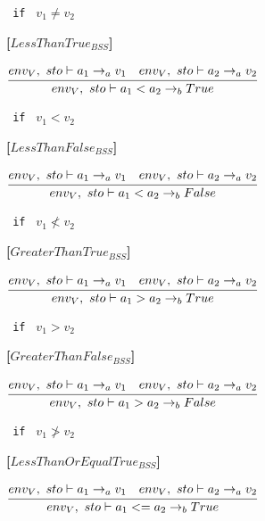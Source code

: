 {\begin{center}
	\texttt{ if } $v_1 \neq v_2$
\end{center}

\textbf{[$LessThanTrue_{BSS}$]}\\
\begin{center}
	\begin{math}
	\cfrac
	{env_V,\ sto \vdash a_1 \rightarrow_a v_1 \quad env_V,\ sto \vdash a_2 \rightarrow_a v_2}
	{env_V,\ sto \vdash a_1 < a_2 \rightarrow_b True}
	\end{math}
	
	\texttt{ if } $v_1 < v_2$
\end{center}

\textbf{[$LessThanFalse_{BSS}$]}\\
\begin{center}
	\begin{math}
	\cfrac
	{env_V,\ sto \vdash a_1 \rightarrow_a v_1 \quad env_V,\ sto \vdash a_2 \rightarrow_a v_2}
	{env_V,\ sto \vdash a_1 < a_2 \rightarrow_b False}
	\end{math}
	
	\texttt{ if } $v_1 \not< v_2$
\end{center}

\textbf{[$GreaterThanTrue_{BSS}$]}\\
\begin{center}
	\begin{math}
	\cfrac
	{env_V,\ sto \vdash a_1 \rightarrow_a v_1 \quad env_V,\ sto \vdash a_2 \rightarrow_a v_2}
	{env_V,\ sto \vdash a_1 > a_2 \rightarrow_b True}
	\end{math}
	
	\texttt{ if } $v_1 > v_2$
\end{center}

\textbf{[$GreaterThanFalse_{BSS}$]}\\
\begin{center}
	\begin{math}
	\cfrac
	{env_V,\ sto \vdash a_1 \rightarrow_a v_1 \quad env_V,\ sto \vdash a_2 \rightarrow_a v_2}
	{env_V,\ sto \vdash a_1 > a_2 \rightarrow_b False}
	\end{math}
	
	\texttt{ if } $v_1 \not> v_2$
\end{center}

\textbf{[$LessThanOrEqualTrue_{BSS}$]}\\
\begin{center}
	\begin{math}
	\cfrac
	{env_V,\ sto \vdash a_1 \rightarrow_a v_1 \quad env_V,\ sto \vdash a_2 \rightarrow_a v_2}
	{env_V,\ sto \vdash a_1 <= a_2 \rightarrow_b True}
	\end{math}
	

\end{center}}
